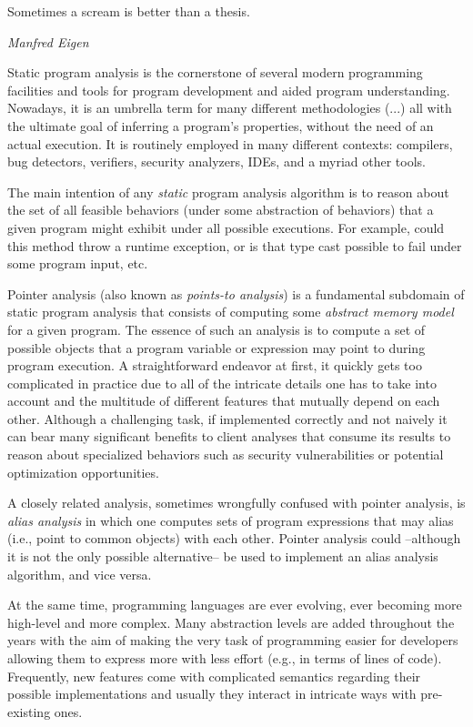 \label{chapter:intro}

\epigraph{Sometimes a scream is better than a thesis.}{\textit{Manfred Eigen}}

Static program analysis is the cornerstone of several modern programming facilities and tools for program development and aided program understanding. Nowadays, it is an umbrella term for many different methodologies (...) all with the ultimate goal of inferring a program's properties, without the need of an actual execution. It is routinely employed in many different contexts: compilers, bug detectors, verifiers, security analyzers, IDEs, and a myriad other tools. 

The main intention of any \emph{static} program analysis algorithm is to reason about the set of all feasible behaviors (under some abstraction of behaviors) that a given program might exhibit under all possible executions. For example, could this method throw a runtime exception, or is that type cast possible to fail under some program input, etc.

Pointer analysis (also known as \emph{points-to analysis}) is a fundamental subdomain of static program analysis that consists of computing some \emph{abstract memory model} for a given program. The essence of such an analysis is to compute a set of possible objects that a program variable or expression may point to during program execution. A straightforward endeavor at first, it quickly gets too complicated in practice due to all of the intricate details one has to take into account and the multitude of different features that mutually depend on each other. Although a challenging task, if implemented correctly and not naively it can bear many significant benefits to client analyses that consume its results to reason about specialized behaviors such as security vulnerabilities or potential optimization opportunities.

A closely related analysis, sometimes wrongfully confused with pointer analysis, is \emph{alias analysis} in which one computes sets of program expressions that may alias (i.e., point to common objects) with each other. Pointer analysis could --although it is not the only possible alternative-- be used to implement an alias analysis algorithm, and vice versa.

At the same time, programming languages are ever evolving, ever becoming more high-level and more complex. Many abstraction levels are added throughout the years with the aim of making the very task of programming easier for developers allowing them to express more with less effort (e.g., in terms of lines of code). Frequently, new features come with complicated semantics regarding their possible implementations and usually they interact in intricate ways with pre-existing ones.


